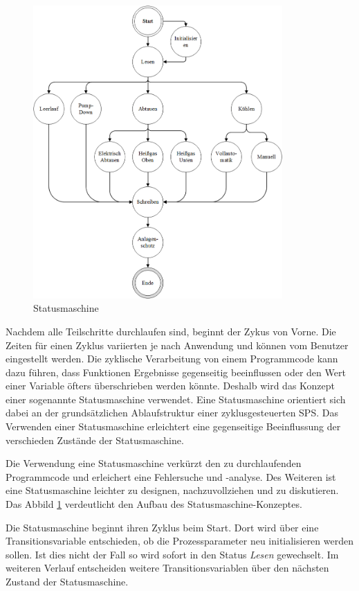 \begin{figure}[htb]
\centering		\includegraphics[width=0.85\textwidth]{Pictures/SM.png}
\caption{Statusmaschine}
\label{fig:SM}
\end{figure}


Nachdem alle Teilschritte durchlaufen sind, beginnt der Zykus von Vorne. Die Zeiten für einen Zyklus variierten je nach Anwendung und können vom Benutzer eingestellt werden. Die zyklische Verarbeitung von einem Programmcode kann dazu führen, dass Funktionen Ergebnisse gegenseitig beeinflussen oder den Wert einer Variable öfters überschrieben werden könnte. Deshalb wird das Konzept einer sogenannte Statusmaschine verwendet. Eine Statusmaschine orientiert sich dabei an der grundsätzlichen Ablaufstruktur einer zyklusgesteuerten SPS. Das Verwenden einer Statusmaschine erleichtert eine gegenseitige Beeinflussung der verschieden Zustände der Statusmaschine. 

Die Verwendung eine Statusmaschine verkürzt den zu durchlaufenden Programmcode und erleichert eine Fehlersuche und -analyse. Des Weiteren ist eine Statusmaschine leichter zu designen, nachzuvollziehen und zu diskutieren. Das Abbild \ref{fig:SM} verdeutlicht den Aufbau des Statusmaschine-Konzeptes. 

Die Statusmaschine beginnt ihren Zyklus beim Start. Dort wird über eine Transitionsvariable entschieden, ob die Prozessparameter neu initialisieren werden sollen. Ist dies nicht der Fall so wird sofort in den Status \textit{Lesen} gewechselt. Im weiteren Verlauf entscheiden weitere Transitionsvariablen über den nächsten Zustand der Statusmaschine.  

